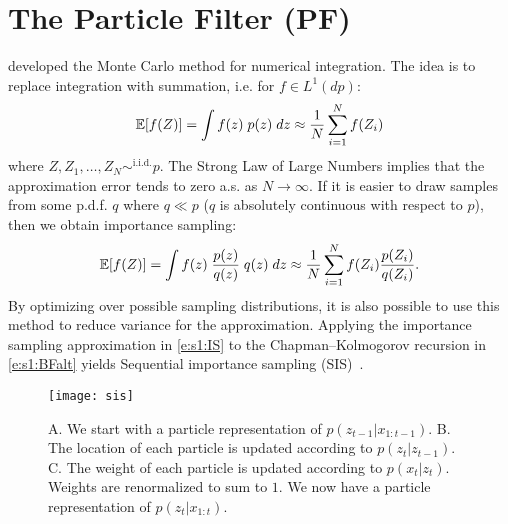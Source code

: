 \section{The Particle Filter (PF)} \label{s:PF}  
\textcite{Met49} developed the Monte Carlo method for numerical integration.  The idea is to replace integration with summation, i.e. for $f\in L^1(dp)$:
\begin{equation}
\operatorname{\mathbb{E}}[f(Z)] = \int f(z)\; p(z)\; dz \approx \frac{1}{N} \sum_{i=1}^N f(Z_i)
\end{equation}
where $Z,Z_1,\dotsc, Z_N\sim^\text{i.i.d.} p$.  The Strong Law of Large Numbers implies that the approximation error tends to zero a.s. as $N\to\infty$.  If it is easier to draw samples from some p.d.f. $q$ where $q\ll p$ ($q$ is absolutely continuous with respect to $p$), then we obtain importance sampling:
\begin{equation} \label{e:s1:IS}
\operatorname{\mathbb{E}}[f(Z)] = \int f(z)\; \frac{p(z)}{q(z)}\; q(z)\; dz \approx \frac{1}{N} \sum_{i=1}^N f(Z_i)\frac{p(Z_i)}{q(Z_i)}.
\end{equation}
By optimizing over possible sampling distributions, it is also possible to use this method to reduce variance for the approximation.  Applying the importance sampling approximation in \eqref{e:s1:IS} to the Chapman--Kolmogorov recursion in \eqref{e:s1:BFalt} yields Sequential importance sampling (SIS)~\cite{Han69,Han70,Kit96,del96,Dou00,Cap05,Cap07}.   

\begin{figure}[h]
\begin{minipage}[c]{.49\textwidth}
\texttt{[image: sis]}
\end{minipage}
\hfill
\begin{minipage}[c]{.49\textwidth}
\caption[Sequential Importance Sampling]{A. We start with a particle representation of $p(z_{t-1}|x_{1:t-1})$.  B. The location of each particle is updated according to $p(z_t|z_{t-1})$.  C. The weight of each particle is updated according to $p(x_t|z_t)$.  Weights are renormalized to sum to $1$.  We now have a particle representation of $p(z_t|x_{1:t})$.}
\end{minipage}
\end{figure}

